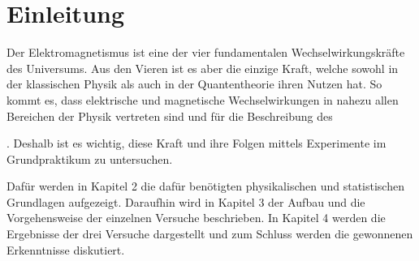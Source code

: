 \section{Einleitung}
\label{sec:einleitung}

Der Elektromagnetismus ist eine der vier fundamentalen Wechselwirkungskräfte des Universums. Aus den Vieren ist es aber die einzige Kraft, welche sowohl in der klassischen Physik als auch in der Quantentheorie ihren Nutzen hat. So kommt es, dass elektrische und magnetische Wechselwirkungen in nahezu allen Bereichen der Physik vertreten sind und für die Beschreibung des 

. Deshalb ist es wichtig, diese Kraft und ihre Folgen mittels Experimente im Grundpraktikum zu untersuchen. 

Dafür werden in Kapitel 2 die dafür benötigten physikalischen und statistischen Grundlagen aufgezeigt. Daraufhin wird in Kapitel 3 der Aufbau und die Vorgehensweise der einzelnen Versuche beschrieben. In Kapitel 4 werden die Ergebnisse der drei Versuche dargestellt und zum Schluss werden die gewonnenen Erkenntnisse diskutiert.